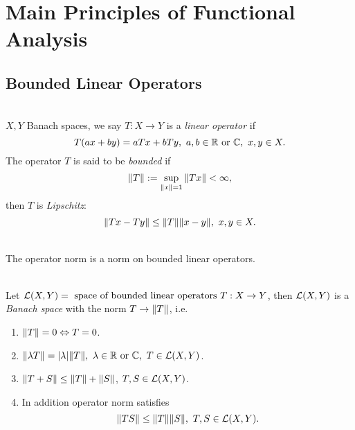 \section{Main Principles of Functional Analysis}
\subsection{Bounded Linear Operators}

\begin{definition}\ \\
    $X,Y$ Banach spaces, we say $T: X \to Y$ is a \textit{linear operator} if 
    \begin{equation*}
        T(ax + by) = a Tx + b Ty,\ a,b \in \mathbb{R} \text{ or }\mathbb{C},\ x,y \in X.
    \end{equation*}
    The operator $T$ is said to be \textit{bounded} if
    \begin{equation*}
        \norm{T} := \sup_{\norm{x} = 1} \norm{Tx} < \infty,
    \end{equation*}
    then $T$ is \textit{Lipschitz}:
    \begin{equation*}
        \norm{Tx - Ty} \leq \norm{T} \norm{x - y},\ x,y \in X.
    \end{equation*}
\end{definition}

\begin{remark}\ \\
The operator norm is a norm on bounded linear operators.
\end{remark}

\vspace{6pt}
\begin{proposition}\ \\
Let $\mathcal{L}(X,Y) = \text{ space of bounded linear operators } T: X \to Y$, then $\mathcal{L}(X,Y)$ is a \textit{Banach space} with the norm $T \to \norm{T}$, i.e.
\begin{enumerate}
    \item $\norm{T} = 0 \Leftrightarrow T = 0$.
    \item $\norm{\lambda T } = \abs{\lambda} \norm{T},\ \lambda \in \mathbb{R} \text{ or } \mathbb{C},\ T \in \mathcal{L}(X,Y)$.
    \item $\norm{T + S} \leq \norm{T} + \norm{S}$, $T,S \in \mathcal{L}(X,Y)$.
    \item In addition operator norm satisfies
    \begin{equation*}
        \norm{TS} \leq \norm{T} \norm{S},\ T,S \in \mathcal{L}(X,Y).
    \end{equation*}
\end{enumerate}
\end{proposition}

